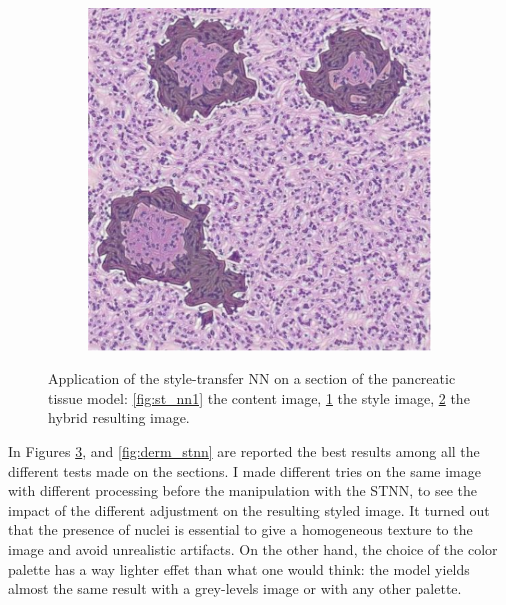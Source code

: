 \documentclass[12pt,a4paper]{report}
\begin{document}
\begin{description}
\begin{figure}
\begin{subfigure}[t]{0.3\textwidth}
                 \caption{}
                 \label{fig:st_nn2}
            \end{subfigure}
            \quad
            \begin{subfigure}[t]{0.3\textwidth}
                 \centering
                 \includegraphics[width = \textwidth]{images/st_nn3}
                 \caption{}
                 \label{fig:st_nn3}
            \end{subfigure}
            \caption{Application of the style-transfer NN on a section of the pancreatic tissue model: \ref{fig:st_nn1} the content image, \ref{fig:st_nn2} the style image, \ref{fig:st_nn3} the hybrid resulting image.}
            \label{fig:panc_stnn}
        \end{figure}

        In Figures \ref{fig:panc_stnn}, and \ref{fig:derm_stnn} are reported the best results among all the different tests made on the sections. I made different tries on the same image with different processing before the manipulation with the STNN, to see the impact of the different adjustment on the resulting styled image. It turned out that the presence of nuclei is essential to give a homogeneous texture to the image and avoid unrealistic artifacts. On the other hand, the choice of the color palette has a way lighter effet than what one would think: the model yields almost the same result with a grey-levels image or with any other palette.


\end{description}
\end{document}

